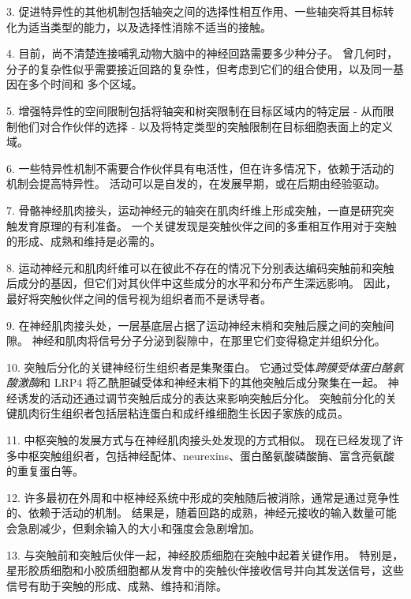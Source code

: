 3. 促进特异性的其他机制包括轴突之间的选择性相互作用、一些轴突将其目标转化为适当类型的能力，以及选择性消除不适当的接触。


4. 目前，尚不清楚连接哺乳动物大脑中的神经回路需要多少种分子。
曾几何时，分子的复杂性似乎需要接近回路的复杂性，但考虑到它们的组合使用，以及同一基因在多个时间和 多个区域。


5. 增强特异性的空间限制包括将轴突和树突限制在目标区域内的特定层 - 从而限制他们对合作伙伴的选择 - 以及将特定类型的突触限制在目标细胞表面上的定义域。 


6. 一些特异性机制不需要合作伙伴具有电活性，但在许多情况下，依赖于活动的机制会提高特异性。
活动可以是自发的，在发展早期，或在后期由经验驱动。 


7. 骨骼神经肌肉接头，运动神经元的轴突在肌肉纤维上形成突触，一直是研究突触发育原理的有利准备。
一个关键发现是突触伙伴之间的多重相互作用对于突触的形成、成熟和维持是必需的。


8. 运动神经元和肌肉纤维可以在彼此不存在的情况下分别表达编码突触前和突触后成分的基因，但它们对其伙伴中这些成分的水平和分布产生深远影响。
因此，最好将突触伙伴之间的信号视为组织者而不是诱导者。


9. 在神经肌肉接头处，一层基底层占据了运动神经末梢和突触后膜之间的突触间隙。
神经和肌肉将信号分子分泌到裂隙中，在那里它们变得稳定并组织分化。


10. 突触后分化的关键神经衍生组织者是集聚蛋白。
它通过受体\textit{跨膜受体蛋白酪氨酸激酶}和 LRP4 将乙酰胆碱受体和神经末梢下的其他突触后成分聚集在一起。
神经诱发的活动还通过调节突触后成分的表达来影响突触后分化。
突触前分化的关键肌肉衍生组织者包括层粘连蛋白和成纤维细胞生长因子家族的成员。


11. 中枢突触的发展方式与在神经肌肉接头处发现的方式相似。
现在已经发现了许多中枢突触组织者，包括神经配体、neurexins、蛋白酪氨酸磷酸酶、富含亮氨酸的重复蛋白等。


12. 许多最初在外周和中枢神经系统中形成的突触随后被消除，通常是通过竞争性的、依赖于活动的机制。
结果是，随着回路的成熟，神经元接收的输入数量可能会急剧减少，但剩余输入的大小和强度会急剧增加。


13. 与突触前和突触后伙伴一起，神经胶质细胞在突触中起着关键作用。
特别是，星形胶质细胞和小胶质细胞都从发育中的突触伙伴接收信号并向其发送信号，这些信号有助于突触的形成、成熟、维持和消除。


